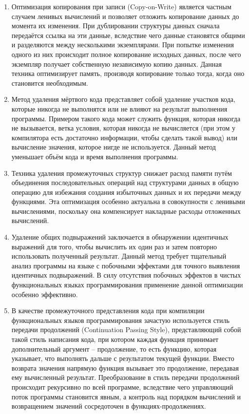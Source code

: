 \begin{enumerate}
\item Оптимизация копирования при записи (Copy-on-Write) является частным случаем ленивых вычислений и позволяет отложить копирование данных до момента их изменения. При дублировании структуры данных сначала передаётся ссылка на эти данные, вследствие чего данные становятся общими и разделяются между несколькими экземплярами. При попытке изменения одного из них происходит полное копирование исходных данных, после чего экземпляр получает собственную независимую копию данных. Данная техника оптимизирует память, производя копирование только тогда, когда оно становится необходимым.
\item Метод удаления мёртвого кода представляет собой удаление участков кода, которые никогда не выполнятся или не влияют на результат выполнения программы. Примером такого кода может служить функция, которая никогда не вызывается, ветка условия, которая никогда не вычисляется (при этом у компилятора есть достаточно информации, чтобы сделать такой вывод) или вычисление значения, которое нигде не используется. Данный метод уменьшает объём кода и время выполнения программы.
\item Техника удаления промежуточных структур снижает расход памяти путём объединения последовательных операций над структурами данных в общую операцию для избежания создания избыточных данных и их передачи между функциями. Эта оптимизация особенно актуальна в совокупности с ленивыми вычислениями, поскольку она компенсирует накладные расходы отложенных вычислений.
\item Удаление общих подвыражений заключается в обнаружении идентичных выражений для того, чтобы вычислить их один раз и затем повторно использовать полученный результат. Данный метод требует тщательный анализ программы на языке с побочными эффектами для точного выявления идентичных подвыражений. В силу отсутствия побочных эффектов в чистых функциональных языках программирования применение данной оптимизации особенно эффективно.
\item В качестве промежуточного представления кода при компиляции функциональных языков программирования зачастую используется стиль передачи продолжений (Continuation Passing Style), представляющий собой такой стиль написания кода, при котором каждая функция принимает дополнительный аргумент -- продолжение, то есть функцию, которая указывает, что выполнять дальше с результатом текущей функции. Вместо возврата значения напрямую функция вызывает это продолжение, передавая ему вычисленный результат. Преобразование в стиль передачи продолжений происходит рекурсивно по всей программе, вследствие чего управляющий поток программы становится явным, а контроль над порядком вычислений и возвращением значений сосредоточен в функциях-продолжениях.
\end{enumerate}

